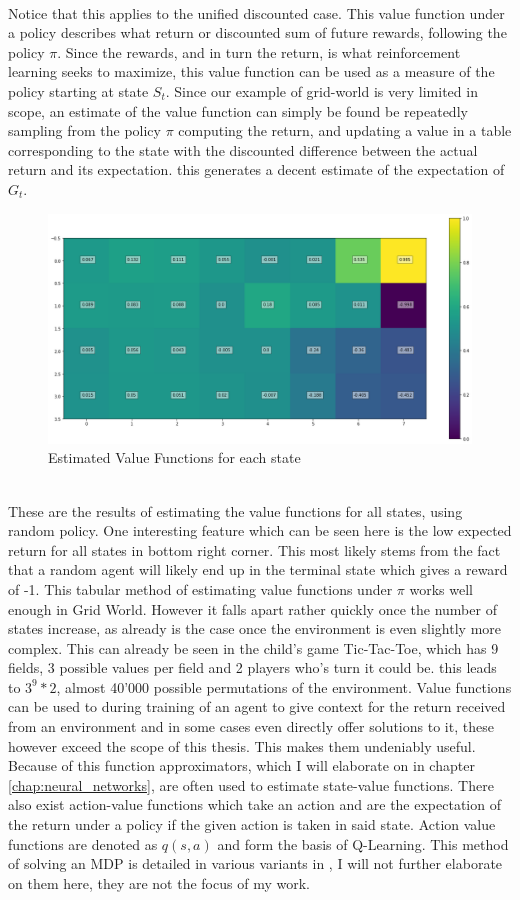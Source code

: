 \noindent
\\ Notice that this applies to the unified discounted case. This value function under a policy describes what return or discounted sum of future rewards, following the policy $\pi$. Since the rewards, and in turn the return, is what reinforcement learning seeks to maximize, this value function can be used as a measure of the policy starting at state $S_t$. Since our example of grid-world is very limited in scope, an estimate of the value function can simply be found be repeatedly sampling from the policy $\pi$ computing the return, and updating a value in a table corresponding to the state with the discounted difference between the actual return and its expectation. this generates a decent estimate of the expectation of $G_t$.

\begin{figure}[h!]
    \centering
    \includegraphics[width=0.6\linewidth]{figures/state_values_under_pi.png}
    \caption{Estimated Value Functions for each state}
    \label{fig:value_functions_grid_world}
\end{figure}

\noindent
\\ These are the results of estimating the value functions for all states, using random policy. One interesting feature which can be seen here is the low expected return for all states in bottom right corner. This most likely stems from the fact that a random agent will likely end up in the terminal state which gives a reward of -1. This tabular method of estimating value functions under $\pi$ works well enough in Grid World. However it falls apart rather quickly once the number of states increase, as already is the case once the environment is even slightly more complex. This can already be seen in the child's game Tic-Tac-Toe, which has 9 fields, 3 possible values per field and 2 players who's turn it could be. this leads to $3^9 * 2$, almost 40'000 possible permutations of the environment. Value functions can be used to during training of an agent to give context for the return received from an environment and in some cases even directly offer solutions to it, these however exceed the scope of this thesis. This makes them undeniably useful. Because of this function approximators, which I will elaborate on in chapter \ref{chap:neural_networks}, are often used to estimate state-value functions. There also exist action-value functions which take an action and are the expectation of the return under a policy if the given action is taken in said state. Action value functions are denoted as $q(s, a)$ and form the basis of Q-Learning. This method of solving an MDP is detailed in various variants in \cite{sutton_reinforcement_2018}, I will not further elaborate on them here, they are not the focus of my work.
